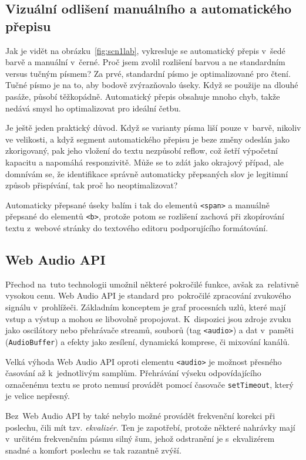 \subsection{Vizuální odlišení manuálního a automatického přepisu}

Jak je vidět na obrázku~\ref{fig:scn1lab}, vykresluje se automatický přepis
v~šedé barvě a manuální v~černé. Proč jsem zvolil rozlišení barvou a ne standardním
versus tučným písmem? Za prvé, standardní písmo je optimalizované pro čtení.
Tučné písmo je na to, aby bodově zvýrazňovalo úseky. Když se použije na dlouhé
pasáže, působí těžkopádně. Automatický přepis obsahuje mnoho chyb, takže nedává
smysl ho optimalizovat pro ideální četbu.

Je ještě jeden praktický důvod. Když se varianty písma liší pouze v~barvě,
nikoliv ve velikosti, a když segment automatického přepisu je beze změny odeslán
jako zkorigovaný, pak jeho vložení do textu nezpůsobí reflow, což šetří
výpočetní kapacitu a napomáhá responzivitě. Může se to zdát jako okrajový
případ, ale domnívám se, že identifikace správně automaticky přepsaných slov je
legitimní způsob přispívání, tak proč ho neoptimalizovat?

Automaticky přepsané úseky balím i tak do elementů
\texttt{<span>} a manuálně přepsané do elementů \texttt{<b>}, protože potom se
rozlišení zachová při zkopírování textu z~webové stránky do textového editoru
podporujícího formátování.

\subsection{Web Audio API}

Přechod na~tuto technologii umožnil některé pokročilé funkce, avšak za~relativně
vysokou cenu. Web Audio API je standard pro~pokročilé zpracování zvukového
signálu v~prohlížeči. Základním konceptem je graf procesních uzlů, které mají
vstup a výstup a mohou se libovolně propojovat. K~dispozici jsou zdroje zvuku
jako oscilátory nebo přehrávače streamů, souborů (tag \texttt{<audio>}) a dat
v~paměti (\texttt{AudioBuffer}) a efekty jako zesílení, dynamická komprese, či
mixování kanálů.

Velká výhoda Web Audio API oproti elementu \texttt{<audio>} je možnost přesného
časování až k~jednotlivým samplům. Přehrávání výseku odpovídajícího označenému
textu se proto nemusí provádět pomocí časovače \texttt{setTimeout}, který je
velice nepřesný.

Bez~Web Audio API by také nebylo možné provádět frekvenční korekci při poslechu,
čili mít tzv. \textit{ekvalizér}. Ten je zapotřebí, protože některé nahrávky
mají v~určitém frekvenčním pásmu silný šum, jehož odstranění je s~ekvalizérem
snadné a komfort poslechu se tak razantně zvýší.

